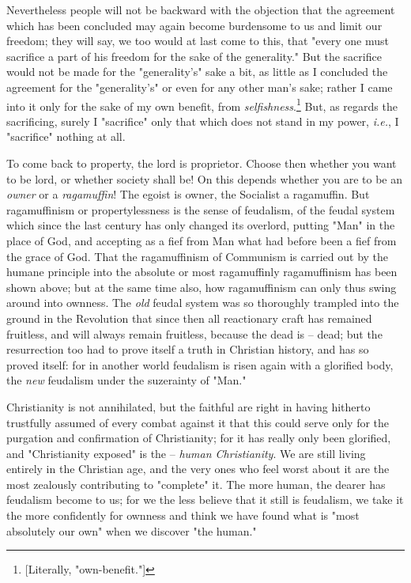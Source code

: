 \documentclass[a4paper]{book}
\begin{document}
Nevertheless people will not be backward with the objection that the agreement 
which has been concluded may again become burdensome to us and limit our 
freedom; they will say, we too would at last come to this, that "{}every one 
must sacrifice a part of his freedom for the sake of the generality."{} But 
the sacrifice would not be made for the "{}generality's"{} sake a bit, as 
little as I concluded the agreement for the "{}generality's"{} or even for any 
other man's sake; rather I came into it only for the sake of my own benefit, 
from \textit{selfishness}.\footnote{[Literally, "{}own-benefit."{}]} But, as 
regards the sacrificing, surely I "{}sacrifice"{} only that which does not 
stand in my power, \textit{i.e.}, I "{}sacrifice"{} nothing at all.

To come back to property, the lord is proprietor. Choose then whether you want 
to be lord, or whether society shall be! On this depends whether you are to be 
an \textit{owner} or a \textit{ragamuffin}! The egoist is owner, the Socialist 
a ragamuffin. But ragamuffinism or propertylessness is the sense of feudalism, 
of the feudal system which since the last century has only changed its 
overlord, putting "{}Man"{} in the place of God, and accepting as a fief from 
Man what had before been a fief from the grace of God. That the ragamuffinism 
of Communism is carried out by the humane principle into the absolute or most 
ragamuffinly ragamuffinism has been shown above; but at the same time also, 
how ragamuffinism can only thus swing around into ownness. The \textit{old} 
feudal system was so thoroughly trampled into the ground in the Revolution 
that since then all reactionary craft has remained fruitless, and will always 
remain fruitless, because the dead is -- dead; but the resurrection too had to 
prove itself a truth in Christian history, and has so proved itself: for in 
another world feudalism is risen again with a glorified body, the \textit{new} 
feudalism under the suzerainty of "{}Man."{}

Christianity is not annihilated, but the faithful are right in having hitherto 
trustfully assumed of every combat against it that this could serve only for 
the purgation and confirmation of Christianity; for it has really only been 
glorified, and "{}Christianity exposed"{} is the -- \textit{human 
Christianity}. We are still living entirely in the Christian age, and the very 
ones who feel worst about it are the most zealously contributing to 
"{}complete"{} it. The more human, the dearer has feudalism become to us; for 
we the less believe that it still is feudalism, we take it the more 
confidently for ownness and think we have found what is "{}most absolutely our 
own"{} when we discover "{}the human."{}
\end{document}
